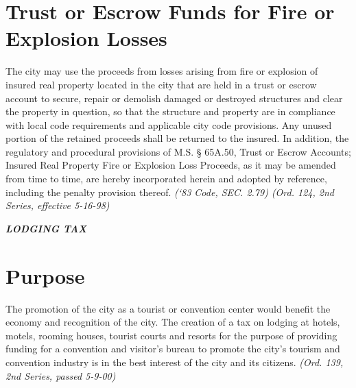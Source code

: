 \section{Trust or Escrow Funds for Fire or Explosion Losses}
The city may use the proceeds from losses arising from fire or explosion of insured real property located in the city that are held in a trust or escrow account to secure, repair or demolish damaged or destroyed structures and clear the property in question, so that the structure and property are in compliance with local code requirements and applicable city code provisions.  Any unused portion of the retained proceeds shall be returned to the insured.  In addition, the regulatory and procedural provisions of M.S. §  65A.50, Trust or Escrow Accounts; Insured Real Property Fire or Explosion Loss Proceeds, as it may be amended from time to time, are hereby incorporated herein and adopted by reference, including the penalty provision thereof.\newline
\emph{(‘83 Code, SEC. 2.79)  (Ord. 124, 2nd Series, effective 5-16-98)}\newline


\centerline{\textbf{\emph{\LARGE{LODGING TAX}}}}
\setcounter{section}{14}
\section{Purpose}
The promotion of the city as a tourist or convention center would benefit the economy and recognition of the city.  The creation of a tax on lodging at hotels, motels, rooming houses, tourist courts and resorts for the purpose of providing funding for a convention and visitor’s bureau to promote the city’s tourism and convention industry is in the best interest of the city and its citizens.\newline
\emph{(Ord. 139, 2nd Series, passed 5-9-00)}
